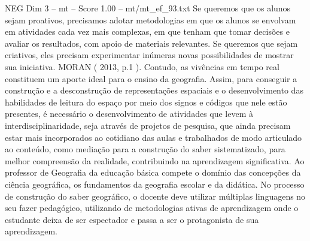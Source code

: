 \begin{textsample}{NEG Dim 3 – mt – Score 1.00 – mt/mt\_ef\_93.txt}
Se queremos que os alunos sejam proativos, precisamos adotar metodologias em que os alunos se envolvam em atividades cada vez mais complexas, em que tenham que tomar decisões e avaliar os resultados, com apoio de materiais relevantes.
Se queremos que sejam criativos, eles precisam experimentar inúmeras novas possibilidades de mostrar sua iniciativa.
MORAN ( 2013, p.1 ).
Contudo, as vivências em tempo real constituem um aporte ideal para o ensino da geografia.
Assim, para conseguir a construção e a desconstrução de representações espaciais e o desenvolvimento das habilidades de leitura do espaço por meio dos signos e códigos que nele estão presentes, é necessário o desenvolvimento de atividades que levem à interdisciplinaridade, seja através de projetos de pesquisa, que ainda precisam estar mais incorporados ao cotidiano das aulas e trabalhados de modo articulado ao conteúdo, como mediação para a construção do saber sistematizado, para melhor compreensão da realidade, contribuindo na aprendizagem significativa.
Ao professor de Geografia da educação básica compete o domínio das concepções da ciência geográfica, os fundamentos da geografia escolar e da didática.
No processo de construção do saber geográfico, o docente deve utilizar múltiplas linguagens no seu fazer pedagógico, utilizando de metodologias ativas de aprendizagem onde o estudante deixa de ser espectador e passa a ser o protagonista de sua aprendizagem.

\end{textsample}
